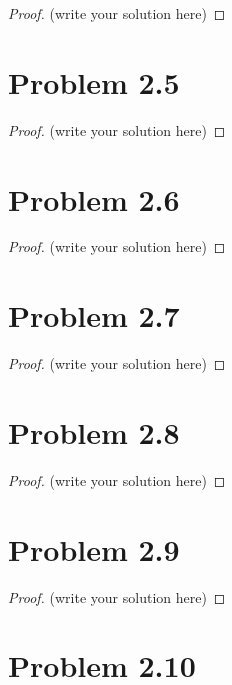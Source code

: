 \documentclass[12pt]{article}
\begin{document}
\begin{proof}
	(write your solution here)
\end{proof}

\newpage 

\section{Problem 2.5}

\begin{proof}
	(write your solution here)
\end{proof}

\newpage 

\section{Problem 2.6}

\begin{proof}
	(write your solution here)
\end{proof}

\newpage 

\section{Problem 2.7}

\begin{proof}
	(write your solution here)
\end{proof}

\newpage 

\section{Problem 2.8}

\begin{proof}
	(write your solution here)
\end{proof}

\newpage 

\section{Problem 2.9}

\begin{proof}
	(write your solution here)
\end{proof}

\newpage 

\section{Problem 2.10}
\end{document}
